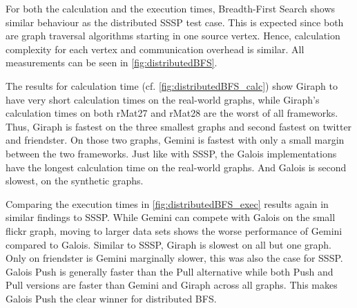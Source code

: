 For both the calculation and the execution times, Breadth-First Search shows similar behaviour as the distributed SSSP test case. This is expected since both are graph traversal algorithms starting in one source vertex.
Hence, calculation complexity for each vertex and communication overhead is similar. All measurements can be seen in \autoref{fig:distributedBFS}.

The results for calculation time (cf. \autoref{fig:distributedBFS_calc}) show Giraph to have very short calculation times on the real-world graphs, while Giraph's calculation times on both rMat27 and rMat28 are the worst of all frameworks. Thus, Giraph is fastest on the three smallest graphs and second fastest on twitter and friendster. On those two graphs, Gemini is fastest with only a small margin between the two frameworks.
Just like with SSSP, the Galois implementations have the longest calculation time on the real-world graphs. And Galois is second slowest, on the synthetic graphs.

Comparing the execution times in \autoref{fig:distributedBFS_exec} results again in similar findings to SSSP.
While Gemini can compete with Galois on the small flickr graph, moving to larger data sets shows the worse performance of Gemini compared to Galois.
Similar to SSSP, Giraph is slowest on all but one graph. Only on friendster is Gemini marginally slower, this was also the case for SSSP.
Galois Push is generally faster than the Pull alternative while both Push and Pull versions are faster than Gemini and Giraph across all graphs.
This makes Galois Push the clear winner for distributed BFS.


